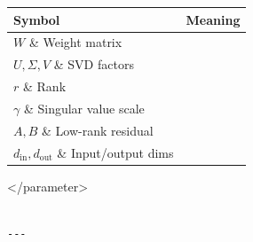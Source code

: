 \begin{table}[H]
\centering
\small
\begin{tabular}{ll}
\toprule
\textbf{Symbol} & \textbf{Meaning} \\
\midrule
$W$ \& Weight matrix \\
$U, \Sigma, V$ \& SVD factors \\
$r$ \& Rank \\
$\gamma$ \& Singular value scale \\
$A, B$ \& Low-rank residual \\
$d_\text{in}, d_\text{out}$ \& Input/output dims \\
\bottomrule
\end{tabular}
\end{table}
\textless{}/parameter\textgreater{}
\begin{lstlisting}

---
\end{lstlisting}